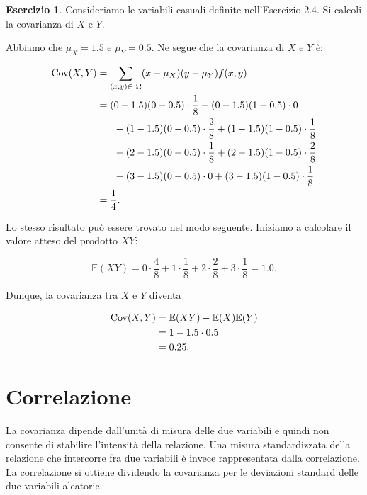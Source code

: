 \documentclass[
  11pt,
]{krantz}
\theoremstyle{definition}
\theoremstyle{definition}
\theoremstyle{definition}
\newtheorem{exercise}{Esercizio}[chapter]
\theoremstyle{definition}
\theoremstyle{remark}
\begin{document}
\begin{exercise}
Consideriamo le variabili casuali definite nell'Esercizio 2.4. Si calcoli la covarianza di \(X\) e \(Y\).

Abbiamo che \(\mu_X = 1.5\) e \(\mu_Y = 0.5\). Ne segue che la covarianza di \(X\) e \(Y\) è:

\begin{equation}
\begin{split}
\mbox{Cov}(X,Y) &= \sum_{(x,y) \in\ \Omega} (x - \mu_X) (y - \mu_Y) f(x, y)\\
&= (0-1.5)(0-0.5)\cdot \frac{1}{8} + (0-1.5)(1-0.5) \cdot 0 \\
   &\hskip0.05\textwidth\relax + (1-1.5)(0-0.5)\cdot \frac{2}{8} + (1-1.5)(1-0.5) \cdot \frac{1}{8} \\
    &\hskip0.05\textwidth\relax + (2-1.5)(0-0.5) \cdot \frac{1}{8} + (2-1.5)(1-0.5) \cdot \frac{2}{8} \\
   &\hskip0.05\textwidth\relax + (3-1.5)(0-0.5) \cdot 0 +  (3-1.5)(1-0.5)\cdot\frac{1}{8} \\
   &= \frac{1}{4}. \notag
 \end{split}
\end{equation}

Lo stesso risultato può essere trovato nel modo seguente. Iniziamo a calcolare il valore atteso del prodotto \(XY\):

\[
\mathbb{E}(XY) = 0 \cdot\frac{4}{8} + 1 \cdot\frac{1}{8} + 2 \cdot\frac{2}{8} + 3 \cdot\frac{1}{8} = 1.0.
\]

Dunque, la covarianza tra \(X\) e \(Y\) diventa

\begin{align}
\mbox{Cov}(X,Y) &= \mathbb{E}(XY) - \mathbb{E}(X)\mathbb{E}(Y)\notag\\
 &= 1 -  1.5\cdot 0.5 \notag\\
 &= 0.25.\notag
\end{align}
\end{exercise}

\hypertarget{correlazione}{%
\section{Correlazione}\label{correlazione}}

La covarianza dipende dall'unità di misura delle due variabili e quindi non consente di stabilire l'intensità della relazione. Una misura standardizzata della relazione che intercorre fra due variabili è invece rappresentata dalla correlazione. La correlazione si ottiene dividendo la covarianza per le deviazioni standard delle due variabili aleatorie.
\end{document}
